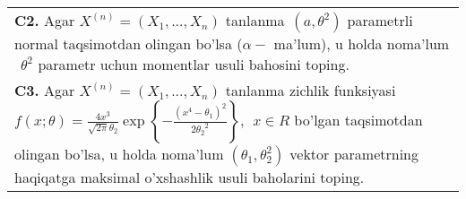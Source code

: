 \documentclass{article}
\begin{document}
\begin{tabular}{m{17cm}}
\\
\textbf{C2.} 
Agar \(X^{(n)} = \left( X_{1},...,X_{n} \right)\) tanlanma\(\ \ (a,\theta^{2})\) parametrli normal taqsimotdan olingan bo'lsa (\(\alpha -\) ma'lum), u holda noma'lum\(\ \ \theta^{2}\) parametr uchun momentlar usuli bahosini toping.
\\
\textbf{C3.} 
Agar \(X^{(n)} = \left( X_{1},...,X_{n} \right)\) tanlanma zichlik funksiyasi\(f(x;\theta) = \frac{4x^{3}}{\sqrt{2\pi}\theta_{2}}\exp\left\{ - \frac{\left( x^{4} - \theta_{1} \right)^{2}}{2{\theta_{2}}^{2}} \right\},\ \ x \in R\) bo'lgan taqsimotdan olingan bo'lsa, u holda noma'lum \(\left( \theta_{1},\theta_{2}^{2} \right)\) vektor parametrning haqiqatga maksimal o'xshashlik usuli baholarini toping.
\\

\end{tabular}
\vspace{1cm}
\end{document}
